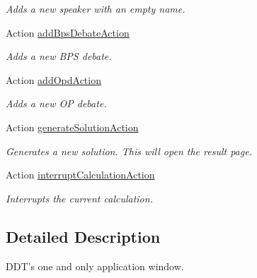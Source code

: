 \begin{DoxyCompactItemize}
\begin{DoxyCompactList}\small\item\em Adds a new speaker with an empty name. \end{DoxyCompactList}\item 
\hypertarget{classmain_a74ad13024bcc95b34992303780e12d6d}{Action \hyperlink{classmain_a74ad13024bcc95b34992303780e12d6d}{add\-Bps\-Debate\-Action}}\label{classmain_a74ad13024bcc95b34992303780e12d6d}

\begin{DoxyCompactList}\small\item\em Adds a new B\-P\-S debate. \end{DoxyCompactList}\item 
\hypertarget{classmain_a750a0cdb3f5ce73ad765a9b0aa5ae92b}{Action \hyperlink{classmain_a750a0cdb3f5ce73ad765a9b0aa5ae92b}{add\-Opd\-Action}}\label{classmain_a750a0cdb3f5ce73ad765a9b0aa5ae92b}

\begin{DoxyCompactList}\small\item\em Adds a new O\-P debate. \end{DoxyCompactList}\item 
\hypertarget{classmain_a8a0e5e7da45ae92f3c70e8cb330a006f}{Action \hyperlink{classmain_a8a0e5e7da45ae92f3c70e8cb330a006f}{generate\-Solution\-Action}}\label{classmain_a8a0e5e7da45ae92f3c70e8cb330a006f}

\begin{DoxyCompactList}\small\item\em Generates a new solution. This will open the result page. \end{DoxyCompactList}\item 
\hypertarget{classmain_a4745a4fc2c425071adf6ffd45b8e859c}{Action \hyperlink{classmain_a4745a4fc2c425071adf6ffd45b8e859c}{interrupt\-Calculation\-Action}}\label{classmain_a4745a4fc2c425071adf6ffd45b8e859c}

\begin{DoxyCompactList}\small\item\em Interrupts the current calculation. \end{DoxyCompactList}\end{DoxyCompactItemize}


\subsection{Detailed Description}
D\-D\-T's one and only application window. 

